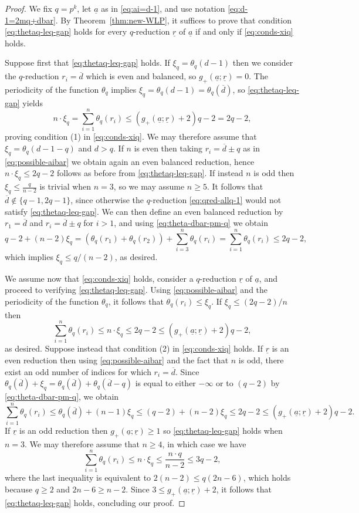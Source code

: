 \documentclass[11pt,reqno]{amsart}
\newcommand{\ol}[1]{\overline{#1}}
\newcommand{\ul}[1]{\underline{#1}}
\theoremstyle{definition}
\theoremstyle{remark}
\numberwithin{equation}{section}
\begin{document}
\begin{proof} We fix $q=p^k$, let $\ul{a}$ as in \eqref{eq:ai=d-1}, and use notation \eqref{eq:d-1=2mq+dbar}. By Theorem~\ref{thm:new-WLP}, it suffices to prove that condition \eqref{eq:thetaq-leq-gap} holds for every $q$-reduction $\ul{r}$ of $\ul{a}$ if and only if \eqref{eq:conds-xiq} holds.

Suppose first that \eqref{eq:thetaq-leq-gap} holds. If $\xi_q=\theta_q(d-1)$ then we consider the $q$-reduction $r_i=\ol{d}$ which is even and balanced, so $g_+(\ul{a};\ul{r})=0$. The periodicity of the function $\theta_q$ implies $\xi_q=\theta_q(d-1)=\theta_q(\ol{d})$, so \eqref{eq:thetaq-leq-gap} yields
\[n\cdot\xi_q = \sum_{i=1}^n\theta_q(r_i) \leq \left(g_+(\ul{a};\ul{r})+2\right)q-2 = 2q-2,\]
proving condition (1) in \eqref{eq:conds-xiq}. We may therefore assume that $\xi_q=\theta_q(d-1-q)$ and $d>q$. If $n$ is even then taking $r_i = \ol{d}\pm q$ as in \eqref{eq:possible-aibar} we obtain again an even balanced reduction, hence $n\cdot\xi_q\leq 2q-2$ follows as before from \eqref{eq:thetaq-leq-gap}. If instead $n$ is odd then $\xi_q \leq\frac{q}{n-2}$ is trivial when $n=3$, so we may assume $n\geq 5$. It follows that $\ol{d}\not\in\{q-1,2q-1\}$, since otherwise the $q$-reduction \eqref{eq:qred-allq-1} would not satisfy \eqref{eq:thetaq-leq-gap}. We can then define an even balanced reduction by $r_1 = \ol{d}$ and $r_i = \ol{d}\pm q$ for $i>1$, and using \eqref{eq:theta-dbar-pm-q} we obtain
\[q-2+(n-2)\xi_q = (\theta_q(r_1)+\theta_q(r_2)) + \sum_{i=3}^n\theta_q(r_i) =  \sum_{i=1}^n\theta_q(r_i) \leq 2q-2,\]
which implies $\xi_q\leq q/(n-2)$, as desired.

We assume now that \eqref{eq:conds-xiq} holds, consider a $q$-reduction $\ul{r}$ of $\ul{a}$, and proceed to verifying \eqref{eq:thetaq-leq-gap}. Using \eqref{eq:possible-aibar} and the periodicity of the function $\theta_q$, it follows that $\theta_q(r_i)\leq \xi_q$. If $\xi_q\leq(2q-2)/n$ then
\[\sum_{i=1}^n\theta_q(r_i) \leq n\cdot\xi_q \leq 2q-2 \leq \left(g_+(\ul{a};\ul{r})+2\right)q-2,\]
as desired. Suppose instead that condition (2) in \eqref{eq:conds-xiq} holds. If $\ul{r}$ is an even reduction then using \eqref{eq:possible-aibar} and the fact that $n$ is odd, there exist an odd number of indices for which $r_i = \ol{d}$. Since $\theta_q(\ol{d})+\xi_q = \theta_q(\ol{d})+\theta_q(\ol{d}-q)$ is equal to either $-\infty$ or to $(q-2)$ by \eqref{eq:theta-dbar-pm-q}, we obtain
\[\sum_{i=1}^n\theta_q(r_i) \leq \theta_q(\ol{d}) + (n-1)\xi_q \leq (q-2)+(n-2)\xi_q \leq 2q-2 \leq \left(g_+(\ul{a};\ul{r})+2\right)q-2. \]
If $\ul{r}$ is an odd reduction then $g_+(\ul{a};\ul{r})\geq 1$ so \eqref{eq:thetaq-leq-gap} holds when $n=3$. We may therefore assume that $n\geq 4$, in which case we have
\[\sum_{i=1}^n\theta_q(r_i) \leq n\cdot\xi_q \leq \frac{n\cdot q}{n-2}\leq 3q-2,\]
where the last inequality is equivalent to $2(n-2)\leq q(2n-6)$, which holds because $q\geq 2$ and $2n-6\geq n-2$. Since $3\leq g_+(\ul{a};\ul{r})+2$, it follows that \eqref{eq:thetaq-leq-gap} holds, concluding our proof.
\end{proof}
\end{document}
